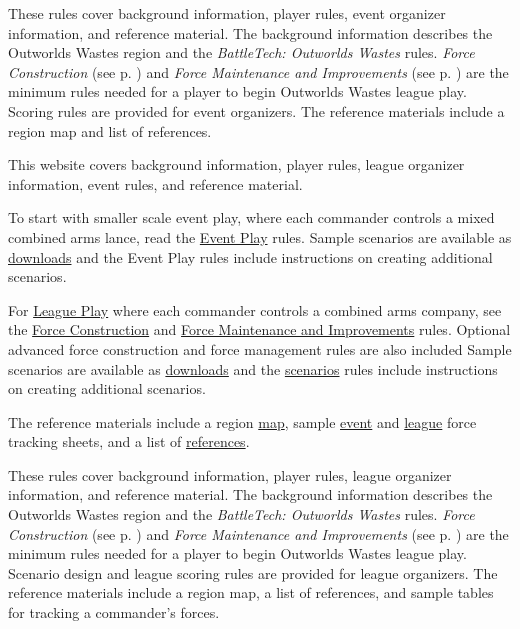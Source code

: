 {
These rules cover background information, player rules, event organizer information, and reference material.
The background information describes the Outworlds Wastes region and the \emph{BattleTech: Outworlds Wastes} rules.
\emph{Force Construction} (see p. \pageref{subsec:event_force_construction}) and \emph{Force Maintenance and Improvements} (see p. \pageref{subsec:event_force_maintenance}) are the minimum rules needed for a player to begin Outworlds Wastes league play.
Scoring rules are provided for event organizers.
The reference materials include a region map and list of references.
} {
 {
This website covers background information, player rules, league organizer information, event rules, and reference material.

To start with smaller scale event play, where each commander controls a mixed combined arms lance, read the \hyperref[sec:event_play]{Event Play} rules.
Sample scenarios are available as \hyperref[sec:downloads]{downloads} and the Event Play rules include instructions on creating additional scenarios.

For \hyperref[sec:league_play]{League Play} where each commander controls a combined arms company, see the \hyperref[subsec:force_construction]{Force Construction} and \hyperref[subsec:force_maintenance]{Force Maintenance and Improvements} rules.
Optional advanced force construction and force management rules are also included
Sample scenarios are available as \hyperref[sec:downloads]{downloads} and the \hyperref[sec:scenarios]{scenarios} rules include instructions on creating additional scenarios.

The reference materials include a region \hyperref[sec:outworlds_wastes_map]{map}, sample \hyperref[sec:sample_tracking_event]{event} and \hyperref[sec:sample_tracking]{league} force tracking sheets, and a list of \hyperref[sec:references]{references}.
} {
These rules cover background information, player rules, league organizer information, and reference material.
The background information describes the Outworlds Wastes region and the \emph{BattleTech: Outworlds Wastes} rules.
\emph{Force Construction} (see p. \pageref{subsec:force_construction}) and \emph{Force Maintenance and Improvements} (see p. \pageref{subsec:force_maintenance}) are the minimum rules needed for a player to begin Outworlds Wastes league play.
Scenario design and league scoring rules are provided for league organizers.
The reference materials include a region map, a list of references, and sample tables for tracking a commander's forces.
}}
